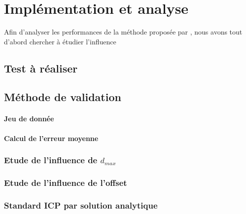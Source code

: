 \section{Implémentation et analyse}
Afin d'analyser les performances de la méthode proposée par \cite{bib_gicp}, nous avons tout d'abord chercher à étudier l'influence 
\subsection{Test à réaliser}
\subsection{Méthode de validation}
\paragraph{Jeu de donnée}
\paragraph{Calcul de l'erreur moyenne}
\subsubsection{Etude de l'influence de $d_{max}$}
\subsubsection{Etude de l'influence de l'offset}
\subsubsection{Standard ICP par solution analytique}